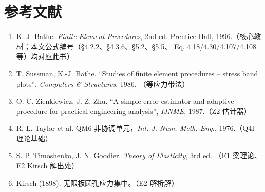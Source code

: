 \documentclass[12pt,a4paper]{ctexart}
\begin{document}
\section{参考文献}

\begin{enumerate}[leftmargin=*]
  \item K.-J. Bathe. \emph{Finite Element Procedures}, 2nd ed. Prentice Hall,
        1996.（核心教材；本文公式编号（§4.2.2、§4.3.6、§5.2、§5.5、
        Eq. 4.18/4.30/4.107/4.108 等）均对应此书）
  \item T. Sussman, K.-J. Bathe. ``Studies of finite element procedures --
        stress band plots'', \emph{Computers \& Structures}, 1986.
        （等应力带法）
  \item O. C. Zienkiewicz, J. Z. Zhu. ``A simple error estimator and
        adaptive procedure for practical engineering analysis'',
        \emph{IJNME}, 1987.（Z2 估计器）
  \item R. L. Taylor et al. QM6 非协调单元，\emph{Int. J. Num. Meth. Eng.},
        1976.（Q4I 理论基础）
  \item S. P. Timoshenko, J. N. Goodier. \emph{Theory of Elasticity}, 3rd ed.
        （E1 梁理论、E2 Kirsch 解出处）
  \item Kirsch (1898). 无限板圆孔应力集中。（E2 解析解）
\end{enumerate}
\end{document}
